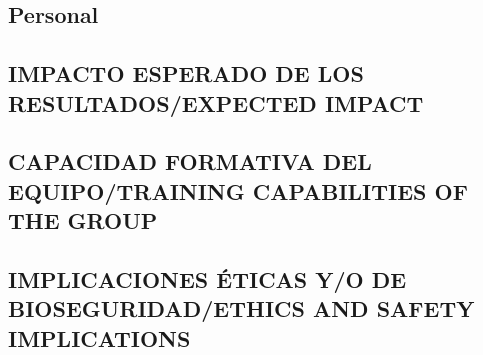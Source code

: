 \documentclass[a4paper,11pt,oneside]{article}
\begin{document}
%

\subsection*{\sc Personal}

\subsection{\sc IMPACTO ESPERADO DE LOS RESULTADOS/EXPECTED IMPACT}
\subsection{\sc CAPACIDAD FORMATIVA DEL EQUIPO/TRAINING CAPABILITIES OF THE GROUP}
\subsection{\sc IMPLICACIONES ÉTICAS Y/O DE BIOSEGURIDAD/ETHICS AND SAFETY IMPLICATIONS}
\end{document}

